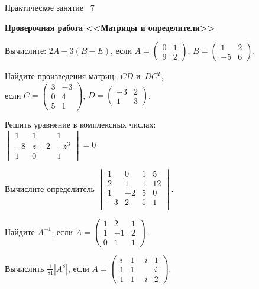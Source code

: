 \documentclass[a5paper,17pt]{extarticle}
\begin{document}
\begin{enumerate}
{\item[]\centering \small Практическое занятие \textnumero~7 
\par\bfseries Проверочная работа <<Матрицы и определители>>\par}
\item Вычислите: $2A-3(B-E)$, если
$A=\begin{pmatrix}0&1\\9&2\end{pmatrix}$, $B=\begin{pmatrix}1&2\\-5&6\end{pmatrix}$.

\item Найдите произведения матриц:~$CD$ и~$DC^T$,\\ если
$C=\begin{pmatrix}3&-3\\ 0 & 4 \\5 & 1 \end{pmatrix}$, 
$D=\begin{pmatrix}-3&2\\1&3\end{pmatrix}$.

\item Решить уравнение в комплексных числах: \\
$\begin{vmatrix}
1 & 1 & 1\\ 
-8 & {z}+2 & -{z}^{3}\\
 1 & 0 & 1
\end{vmatrix}=0$
\item Вычислите определитель $
\begin{vmatrix}
1 & 0 & 1 & 5\\
2 & 1 & 1 & 12\\
1 & -2 & 5 & 0\\
-3 & 2 & 5 & 1\\
\end{vmatrix}.
$
\item Найдите $A^{-1}$, если
$A=\begin{pmatrix}1 & 2 & 1\\ 1 & -1 & 2\\ 0 & 1 & 1\end{pmatrix}$.


\item Вычислить $\frac{1}{81}\left| A^{8}\right|$, если $A=\begin{pmatrix}i & 1-i & 1\\ 1 & 1 & i\\ 1 & 1-i & 2\end{pmatrix}$.
\end{enumerate}
\end{document}
